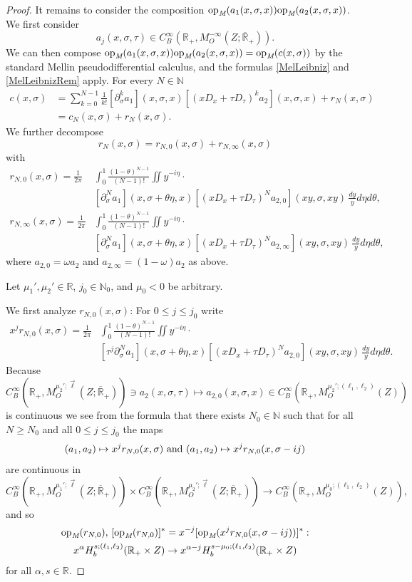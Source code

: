 \documentclass[reqno]{amsart}
\numberwithin{equation}{section}
\theoremstyle{definition}
\def\N{\mathbb N}
\def\R{\mathbb R}
\def\opm{\textup{op}_{\textit{M}}}
\begin{document}
\begin{proof}
It remains to consider the composition $\opm(a_1(x,\sigma,x))\opm(a_2(x,\sigma,x))$. We first consider
$$
a_j(x,\sigma,\tau)  \in C^{\infty}_B(\R_+,M^{-\infty}_{O}(Z;\overline{\R}_+)).
$$
We can then compose $\opm(a_1(x,\sigma,x))\opm(a_2(x,\sigma,x)) = \opm(c(x,\sigma))$ by the standard Mellin pseudodifferential calculus, and the formulas \eqref{MelLeibniz} and \eqref{MelLeibnizRem} apply. For every $N \in \N$
\begin{align*}
c(x,\sigma) &= \sum\limits_{k=0}^{N-1}\frac{1}{k!}[\partial_{\sigma}^ka_1](x,\sigma,x)[(xD_x + \tau D_{\tau})^ka_2](x,\sigma,x) + r_N(x,\sigma) \\
&= c_N(x,\sigma) + r_{N}(x,\sigma).
\end{align*}
We further decompose
$$
r_N(x,\sigma) = r_{N,0}(x,\sigma) + r_{N,\infty}(x,\sigma)
$$
with
\begin{align*}
r_{N,0}(x,\sigma) = \frac{1}{2\pi}\! &\int_0^1\!\frac{(1-\theta)^{N-1}}{(N-1)!} \iint y^{-i\eta} \cdot \\
&[\partial_{\sigma}^Na_1](x,\sigma+\theta\eta,x) [(xD_{x} + \tau D_{\tau})^Na_{2,0}](xy,\sigma,xy)\,\frac{dy}{y}d\eta d\theta, \\
r_{N,\infty}(x,\sigma) = \frac{1}{2\pi}\! &\int_0^1\!\frac{(1-\theta)^{N-1}}{(N-1)!} \iint y^{-i\eta} \cdot \\
&[\partial_{\sigma}^Na_1](x,\sigma+\theta\eta,x) [(xD_{x} + \tau D_{\tau})^Na_{2,\infty}](xy,\sigma,xy)\,\frac{dy}{y}d\eta d\theta,
\end{align*}
where $a_{2,0} = \omega a_2$ and $a_{2,\infty} = (1-\omega)a_2$ as above.

\medskip

\noindent
Let $\mu_1',\mu_2' \in \R$, $j_0 \in \N_0$, and $\mu_0 < 0$ be arbitrary.

We first analyze $r_{N,0}(x,\sigma)$: For $0 \leq j \leq j_0$ write
\begin{align*}
x^jr_{N,0}(x,\sigma) = \frac{1}{2\pi}\! &\int_0^1\!\frac{(1-\theta)^{N-1}}{(N-1)!} \iint y^{-i\eta} \cdot \\
&[\tau^j\partial_{\sigma}^Na_1](x,\sigma+\theta\eta,x) [(xD_{x} + \tau D_{\tau})^Na_{2,0}](xy,\sigma,xy)\,\frac{dy}{y}d\eta d\theta.
\end{align*}
Because
$$
C^{\infty}_B(\R_+,M^{\mu_2';\vec{\ell}}_{O}(Z;\overline{\R}_+)) \ni a_2(x,\sigma,\tau) \mapsto a_{2,0}(x,\sigma,x) \in C^{\infty}_B(\R_+,M^{\mu_2';(\ell_1,\ell_2)}_{O}(Z))
$$
is continuous we see from the formula that there exists $N_0 \in \N$ such that for all $N \geq N_0$ and all $0 \leq j \leq j_0$ the maps
$$
(a_1,a_2) \mapsto x^jr_{N,0}(x,\sigma) \textup{ and } (a_1,a_2) \mapsto x^jr_{N,0}(x,\sigma-ij)
$$
are continuous in
$$
C^{\infty}_B(\R_+,M^{\mu_1';\vec{\ell}}_{O}(Z;\overline{\R}_+)) \times C^{\infty}_B(\R_+,M^{\mu_2';\vec{\ell}}_{O}(Z;\overline{\R}_+)) \to C^{\infty}_B(\R_+,M^{\mu_0;(\ell_1,\ell_2)}_{O}(Z)),
$$
and so
\begin{gather*}
\opm(r_{N,0}),\, [\opm(r_{N,0})]^* = x^{-j} [\opm(x^jr_{N,0}(x,\sigma-ij))]^* : \\
x^{\alpha}H^{s;(\ell_1,\ell_2)}_b(\R_+\times Z) \to x^{\alpha-j}H^{s-\mu_0;(\ell_1,\ell_2)}_b(\R_+\times Z)
\end{gather*}
for all $\alpha,s \in \R$.


\end{proof}
\end{document}
